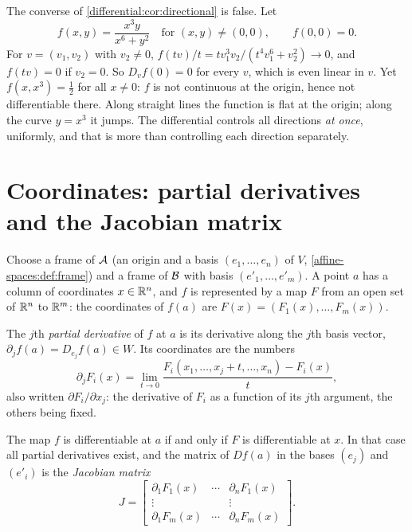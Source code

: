 \begin{notechapter}
\begin{pitfall}
The converse of \cref{differential:cor:directional} is false. Let
\[
  f(x, y) = \frac{x^3y}{x^6 + y^2} \quad\text{for } (x, y)\neq(0, 0),
  \qquad f(0, 0) = 0 .
\]
For $v = (v_1, v_2)$ with $v_2\neq0$,
$f(tv)/t = tv_1^3v_2/(t^4v_1^6 + v_2^2)\to0$, and $f(tv) = 0$ if
$v_2 = 0$. So $D_vf(0) = 0$ for every $v$, which is even linear in $v$.
Yet $f(x, x^3) = \frac12$ for all $x\neq0$: $f$ is not continuous at the
origin, hence not differentiable there. Along straight lines the function
is flat at the origin; along the curve $y = x^3$ it jumps. The differential
controls all directions \emph{at once}, uniformly, and that is more than
controlling each direction separately.
\end{pitfall}

\section{Coordinates: partial derivatives and the Jacobian matrix}
\label{differential:sec:jacobian}

Choose a frame of $\mathcal{A}$ (an origin and a basis $(e_1,\dots,e_n)$ of $V$,
\cref{affine-spaces:def:frame}) and a frame of $\mathcal{B}$ with basis
$(e'_1,\dots,e'_m)$. A point $a$ has a column of coordinates $x\in\mathbb{R}^n$,
and $f$ is represented by a map $F$ from an open set of $\mathbb{R}^n$ to $\mathbb{R}^m$:
the coordinates of $f(a)$ are $F(x) = (F_1(x),\dots,F_m(x))$.

\begin{definition}\label{differential:def:partial}
The $j$th \emph{partial derivative} of $f$ at $a$ is its derivative along
the $j$th basis vector, $\partial_jf(a) = D_{e_j}f(a)\in W$. Its
coordinates are the numbers
\[
  \partial_jF_i(x)
  = \lim_{t\to0}\frac{F_i(x_1,\dots,x_j + t,\dots,x_n) - F_i(x)}t ,
\]
also written $\partial F_i/\partial x_j$: the derivative of $F_i$ as a
function of its $j$th argument, the others being fixed.
\end{definition}

\begin{theorem}\label{differential:thm:jacobian}
The map $f$ is differentiable at $a$ if and only if $F$ is differentiable
at $x$. In that case all partial derivatives exist, and the matrix of
$Df(a)$ in the bases $(e_j)$ and $(e'_i)$ is the \emph{Jacobian matrix}
\[
  J = \begin{bmatrix}
    \partial_1F_1(x) & \cdots & \partial_nF_1(x)\\
    \vdots & & \vdots\\
    \partial_1F_m(x) & \cdots & \partial_nF_m(x)
  \end{bmatrix} .
\]
\end{theorem}


\end{notechapter}
